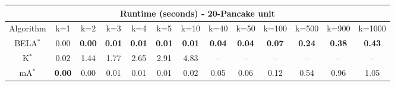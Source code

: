 \begin{tabular}{c|cccccccccccc}\toprule
\multicolumn{13}{c}{Runtime (seconds) - 20-Pancake unit}\\ \midrule
Algorithm & k=1 & k=2 & k=3 & k=4 & k=5 & k=10 & k=40 & k=50 & k=100 & k=500 & k=900 & k=1000 \\ \midrule
BELA$^*$ & 0.00 & \textbf{0.00} & \textbf{0.01} & \textbf{0.01} & \textbf{0.01} & \textbf{0.01} & \textbf{0.04} & \textbf{0.04} & \textbf{0.07} & \textbf{0.24} & \textbf{0.38} & \textbf{0.43} \\
K$^*$ & 0.02 & 1.44 & 1.77 & 2.65 & 2.91 & 4.83 & -- & -- & -- & -- & -- & -- \\
mA$^*$ & \textbf{0.00} & 0.00 & 0.01 & 0.01 & 0.01 & 0.02 & 0.05 & 0.06 & 0.12 & 0.54 & 0.96 & 1.05 \\ \bottomrule 
\end{tabular}
